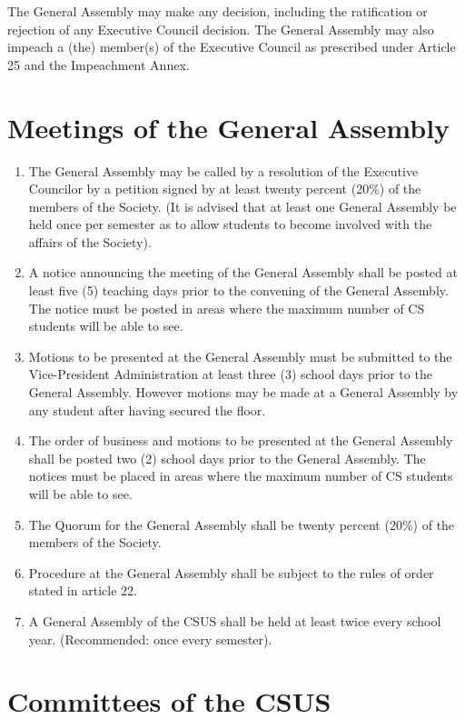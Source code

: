 The General Assembly may make any decision, including the ratification
or rejection of any Executive Council decision. The General Assembly may
also impeach a (the) member(s) of the Executive Council as prescribed
under Article 25 and the Impeachment Annex.

\section{Meetings of the General
Assembly}\label{meetings-of-the-general-assembly}

\begin{enumerate}
\def\labelenumi{\arabic{enumi}.}
\item
  The General Assembly may be called by a resolution of the Executive
  Councilor by a petition signed by at least twenty percent (20\%) of
  the members of the Society. (It is advised that at least one General
  Assembly be held once per semester as to allow students to become
  involved with the affairs of the Society).
\item
  A notice announcing the meeting of the General Assembly shall be
  posted at least five (5) teaching days prior to the convening of the
  General Assembly. The notice must be posted in areas where the maximum
  number of CS students will be able to see.
\item
  Motions to be presented at the General Assembly must be submitted to
  the Vice-President Administration at least three (3) school days prior
  to the General Assembly. However motions may be made at a General
  Assembly by any student after having secured the floor.
\item
  The order of business and motions to be presented at the General
  Assembly shall be posted two (2) school days prior to the General
  Assembly. The notices must be placed in areas where the maximum number
  of CS students will be able to see.
\item
  The Quorum for the General Assembly shall be twenty percent (20\%) of
  the members of the Society.
\item
  Procedure at the General Assembly shall be subject to the rules of
  order stated in article 22.
\item
  A General Assembly of the CSUS shall be held at least twice every
  school year. (Recommended: once every semester).
\end{enumerate}

\section{Committees of the CSUS}\label{committees-of-the-csus}

